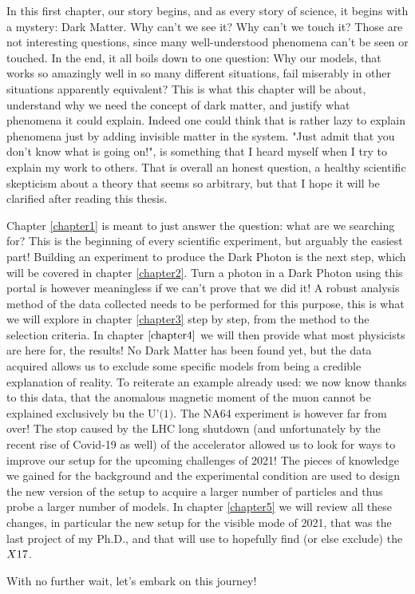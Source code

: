 In this first chapter, our story begins, and as every story of science, it begins with a mystery: Dark Matter. Why can't we see it? Why can't we touch it? Those are not interesting questions, since many well-understood phenomena can't be seen or touched. In the end, it all boils down to one question: Why our models, that works so amazingly well in so many different situations, fail miserably in other situations apparently equivalent? This is what this chapter will be about, understand why we need the concept of dark matter, and justify what phenomena it could explain. Indeed one could think that is rather lazy to explain phenomena just by adding invisible matter in the system. "Just admit that you don't know what is going on!", is something that I heard myself when I try to explain my work to others. That is overall an honest question, a healthy scientific skepticism about a theory that seems so arbitrary, but that I hope it will be clarified after reading this thesis.

Chapter \ref{chapter1} is meant to just answer the question: what are we searching for? This is the beginning of every scientific experiment, but arguably the easiest part! Building an experiment to produce the Dark Photon is the next step, which will be covered in chapter \ref{chapter2}. Turn a photon in a Dark Photon using this portal is however meaningless if we can't prove that we did it! A robust analysis method of the data collected needs to be performed for this purpose, this is what we will explore in chapter \ref{chapter3} step by step, from the method to the selection criteria. In chapter $\ref{chapter4}$ we will then provide what most physicists are here for, the results! No Dark Matter has been found yet, but the data acquired allows us to exclude some specific models from being a credible explanation of reality. To reiterate an example already used: we now know thanks to this data, that the anomalous magnetic moment of the muon cannot be explained exclusively bu the $\textrm{U'(1)}$. The NA64 experiment is however far from over! The stop caused by the LHC long shutdown (and unfortunately by the recent rise of Covid-19 as well) of the accelerator allowed us to look for ways to improve our setup for the upcoming challenges of 2021! The pieces of knowledge we gained for the background and the experimental condition are used to design the new version of the setup to acquire a larger number of particles and thus probe a larger number of models. In chapter \ref{chapter5} we will review all these changes, in particular the new setup for the visible mode of 2021, that was the last project of my Ph.D., and that will use to hopefully find (or else exclude) the $X17$.

With no further wait, let's embark on this journey!

